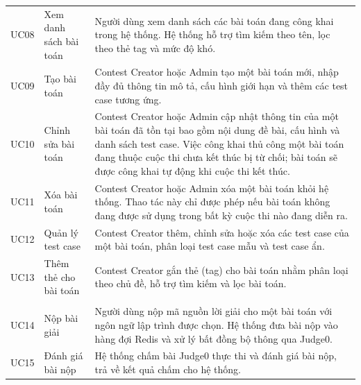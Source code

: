 \documentclass[12pt, a4paper]{report}
\begin{document}
\begin{longtable}{|>{\centering\arraybackslash}p{1.5cm}|>{\raggedright\arraybackslash}p{4.2cm}|>{\raggedright\arraybackslash}p{7.8cm}|}
  \multicolumn{3}{|l|}{\textbf{Nhóm 2: Quản lý bài toán}} \\
  \hline
  UC08 & Xem danh sách bài toán &
    Người dùng xem danh sách các bài toán đang công khai trong hệ thống. Hệ thống hỗ trợ
    tìm kiếm theo tên, lọc theo thẻ tag và mức độ khó. \\
  \hline
  UC09 & Tạo bài toán &
    Contest Creator hoặc Admin tạo một bài toán mới, nhập đầy đủ thông tin mô tả, cấu hình
    giới hạn và thêm các test case tương ứng. \\
  \hline
  UC10 & Chỉnh sửa bài toán &
    Contest Creator hoặc Admin cập nhật thông tin của một bài toán đã tồn tại bao gồm nội
    dung đề bài, cấu hình và danh sách test case. Việc công khai thủ công một bài toán
    đang thuộc cuộc thi chưa kết thúc bị từ chối; bài toán sẽ được công khai tự động khi
    cuộc thi kết thúc. \\
  \hline
  UC11 & Xóa bài toán &
    Contest Creator hoặc Admin xóa một bài toán khỏi hệ thống. Thao tác này chỉ được phép
    nếu bài toán không đang được sử dụng trong bất kỳ cuộc thi nào đang diễn ra. \\
  \hline
  UC12 & Quản lý test case &
    Contest Creator thêm, chỉnh sửa hoặc xóa các test case của một bài toán, phân loại
    test case mẫu và test case ẩn. \\
  \hline
  UC13 & Thêm thẻ cho bài toán &
    Contest Creator gắn thẻ (tag) cho bài toán nhằm phân loại theo chủ đề, hỗ trợ tìm
    kiếm và lọc bài toán. \\
  \hline

  \multicolumn{3}{|l|}{\textbf{Nhóm 3: Nộp bài và xem kết quả}} \\
  \hline
  UC14 & Nộp bài giải &
    Người dùng nộp mã nguồn lời giải cho một bài toán với ngôn ngữ lập trình được chọn. Hệ
    thống đưa bài nộp vào hàng đợi Redis và xử lý bất đồng bộ thông qua Judge0. \\
  \hline
  UC15 & Đánh giá bài nộp &
    Hệ thống chấm bài Judge0 thực thi và đánh giá bài nộp, trả về kết quả chấm cho hệ thống. \\
  \hline


\end{longtable}
\end{document}
